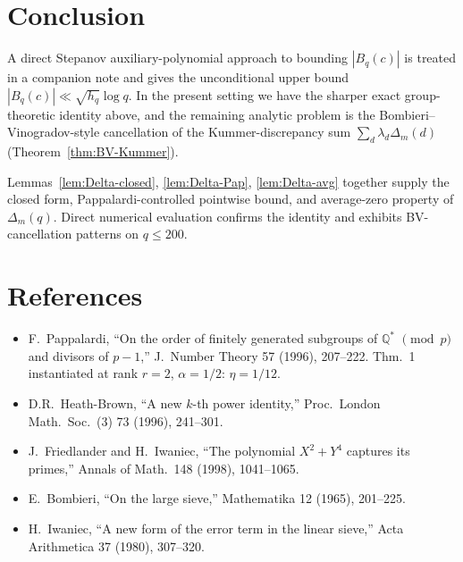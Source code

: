 \documentclass[12pt]{amsart}
\theoremstyle{definition}
\theoremstyle{remark}
\begin{document}
\section{Conclusion}

A direct Stepanov auxiliary-polynomial approach to bounding $|B_q(c)|$ is treated in a companion note
and gives the unconditional upper bound $|B_q(c)| \ll \sqrt{h_q}\log q$. In the present setting we
have the sharper exact group-theoretic identity above, and the remaining analytic problem is the
Bombieri--Vinogradov-style cancellation of the Kummer-discrepancy sum $\sum_d \lambda_d \Delta_m(d)$
(Theorem~\ref{thm:BV-Kummer}).

Lemmas~\ref{lem:Delta-closed}, \ref{lem:Delta-Pap}, \ref{lem:Delta-avg}
together supply the closed form, Pappalardi-controlled pointwise bound, and average-zero property of
$\Delta_m(q)$. Direct numerical evaluation confirms the identity and exhibits BV-cancellation patterns
on $q \le 200$.

\section*{References}

\begin{itemize}
\item[{[P96]}] F.~Pappalardi, ``On the order of finitely generated subgroups of $\mathbb{Q}^*$ $\pmod p$ and divisors of $p - 1$,'' J.~Number Theory 57 (1996), 207--222. Thm.~1 instantiated at rank $r = 2$, $\alpha = 1/2$: $\eta = 1/12$.
\item[{[HB96]}] D.R.~Heath-Brown, ``A new $k$-th power identity,'' Proc.~London Math.~Soc.~(3) 73 (1996), 241--301.
\item[{[FI98]}] J.~Friedlander and H.~Iwaniec, ``The polynomial $X^2 + Y^4$ captures its primes,'' Annals of Math.~148 (1998), 1041--1065.
\item[{[BV65]}] E.~Bombieri, ``On the large sieve,'' Mathematika 12 (1965), 201--225.
\item[{[L80]}] H.~Iwaniec, ``A new form of the error term in the linear sieve,'' Acta Arithmetica 37 (1980), 307--320.
\end{itemize}
\end{document}
